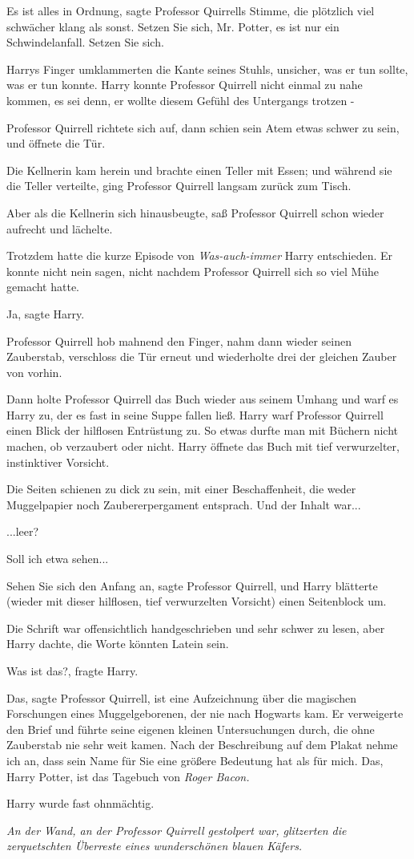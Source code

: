 \glqq{}Es ist alles in Ordnung\grqq{}, sagte Professor Quirrells Stimme, die
plötzlich viel schwächer klang als sonst. \glqq{}Setzen Sie sich, Mr. Potter, es
ist nur ein Schwindelanfall. Setzen Sie sich.\grqq{}

Harrys Finger umklammerten die Kante seines Stuhls, unsicher, was er tun sollte,
was er tun konnte. Harry konnte Professor Quirrell nicht einmal zu nahe kommen,
es sei denn, er wollte diesem Gefühl des Untergangs trotzen -

Professor Quirrell richtete sich auf, dann schien sein Atem etwas schwer zu
sein, und öffnete die Tür.

Die Kellnerin kam herein und brachte einen Teller mit Essen; und während sie die
Teller verteilte, ging Professor Quirrell langsam zurück zum Tisch.

Aber als die Kellnerin sich hinausbeugte, saß Professor Quirrell schon wieder
aufrecht und lächelte.

Trotzdem hatte die kurze Episode von \emph{\glqq{}Was-auch-immer\grqq{}} Harry
entschieden. Er konnte nicht nein sagen, nicht nachdem Professor Quirrell sich
so viel Mühe gemacht hatte.

\glqq{}Ja\grqq{}, sagte Harry.

Professor Quirrell hob mahnend den Finger, nahm dann wieder seinen Zauberstab,
verschloss die Tür erneut und wiederholte drei der gleichen Zauber von vorhin.

Dann holte Professor Quirrell das Buch wieder aus seinem Umhang und warf es
Harry zu, der es fast in seine Suppe fallen ließ. Harry warf Professor Quirrell
einen Blick der hilflosen Entrüstung zu. So etwas durfte man mit Büchern nicht
machen, ob verzaubert oder nicht. Harry öffnete das Buch mit tief verwurzelter,
instinktiver Vorsicht.

Die Seiten schienen zu dick zu sein, mit einer Beschaffenheit, die weder
Muggelpapier noch Zaubererpergament entsprach. Und der Inhalt war...

...leer?

\glqq{} Soll ich etwa sehen...\grqq{}

\glqq{}Sehen Sie sich den Anfang an\grqq{}, sagte Professor Quirrell, und Harry
blätterte (wieder mit dieser hilflosen, tief verwurzelten Vorsicht) einen
Seitenblock um.

Die Schrift war offensichtlich handgeschrieben und sehr schwer zu lesen, aber
Harry dachte, die Worte könnten Latein sein.

\glqq{}Was ist das?\grqq{}, fragte Harry.

\glqq{}Das\grqq{}, sagte Professor Quirrell, \glqq{}ist eine Aufzeichnung über
die magischen Forschungen eines Muggelgeborenen, der nie nach Hogwarts kam. Er
verweigerte den Brief und führte seine eigenen kleinen Untersuchungen durch, die
ohne Zauberstab nie sehr weit kamen. Nach der Beschreibung auf dem Plakat nehme
ich an, dass sein Name für Sie eine größere Bedeutung hat als für mich. Das,
Harry Potter, ist das Tagebuch von \emph{Roger Bacon.}\grqq{}

Harry wurde fast ohnmächtig.

\emph{An der Wand, an der Professor Quirrell gestolpert war, glitzerten die
zerquetschten Überreste eines wunderschönen blauen Käfers.}
